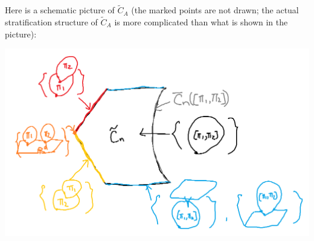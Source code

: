 \documentclass[11pt]{article}
\theoremstyle{definition}
\theoremstyle{remark}
\def\wt#1{\widetilde{#1}}
\begin{document}
Here is a schematic picture of $\wt{C}_A$ (the marked points are not drawn; the actual stratification structure of $\wt{C}_A$ is more complicated than what is shown in the picture): 

\includegraphics[scale=0.7]{conftilde.png}
\end{document}
